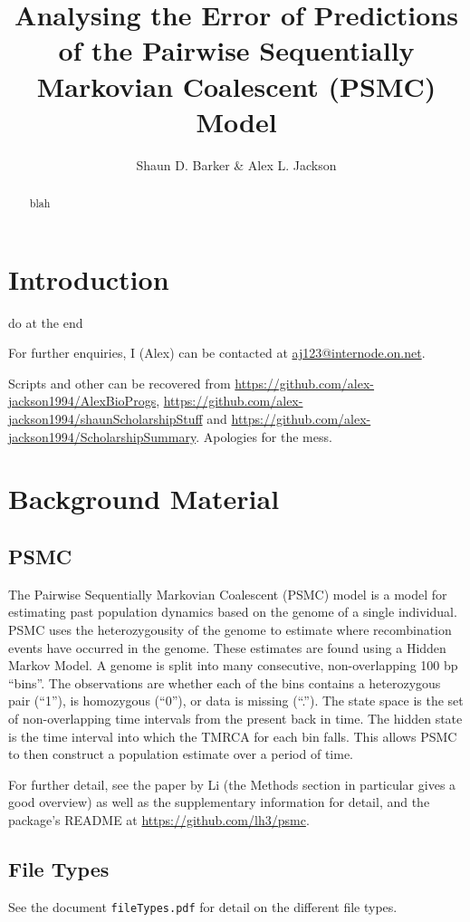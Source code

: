 \documentclass[11pt,a4paper]{article}
\title{Analysing the Error of Predictions of the Pairwise Sequentially Markovian Coalescent (PSMC) Model}
\author{Shaun D. Barker & Alex L. Jackson}
\begin{document}
\maketitle

\begin{abstract}
blah

\end{abstract}
\section{Introduction}
do at the end

For further enquiries, I (Alex) can be contacted at \href{mailto:aj123@internode.on.net}{aj123@internode.on.net}.

Scripts and other can be recovered from \url{https://github.com/alex-jackson1994/AlexBioProgs}, \url{https://github.com/alex-jackson1994/shaunScholarshipStuff} and \url{https://github.com/alex-jackson1994/ScholarshipSummary}. Apologies for the mess.

\section{Background Material}
\subsection{PSMC}
The Pairwise Sequentially Markovian Coalescent (PSMC) model \cite{li2011inference} is a model for estimating past population dynamics based on the  genome of a single individual. PSMC uses the heterozygousity of the genome to estimate where recombination events have occurred in the genome. These estimates are found using a Hidden Markov Model. A genome is split into many consecutive, non-overlapping 100 bp ``bins''. The observations are whether each of the bins contains a heterozygous pair (``1''), is homozygous (``0''), or data is missing (``.''). The state space is the set of non-overlapping time intervals from the present back in time. The hidden state is the time interval into which the TMRCA for each bin falls. This allows PSMC to then construct a population estimate over a period of time. 

For further detail, see the paper by Li \cite{li2011inference} (the Methods section in particular gives a good overview) as well as the supplementary information for detail, and the package's README at \url{https://github.com/lh3/psmc}.

\subsection{File Types}
See the document \verb|fileTypes.pdf| for detail on the different file types.
\end{document}
